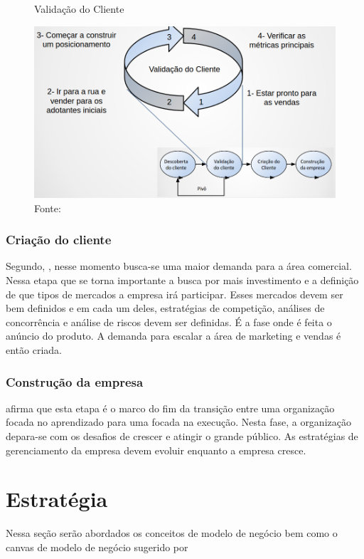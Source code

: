 \begin{figure}[H]
\caption{Validação do Cliente}
\centerline{\includegraphics[scale=0.5]{img/validacao_do_cliente}}
\label{fig:validacao_do_cliente}
\caption* {Fonte: }
\end{figure}

\subsubsection{Criação do cliente}
\label{cha:criacao_do_cliente}
Segundo, , nesse momento busca-se uma maior demanda para a área comercial. Nessa etapa que se torna importante a busca por mais investimento e a definição de que tipos de mercados a empresa irá participar. Esses mercados devem ser bem definidos e em cada um deles, estratégias de competição, análises de concorrência e análise de riscos devem ser definidas. É a fase onde é feita o anúncio do produto. A demanda para escalar a área de marketing e vendas é então criada.

\subsubsection{Construção da empresa}
\label{cha:construcao_da_empresa}
 afirma que esta etapa é o marco do fim da transição entre uma organização focada no aprendizado para uma focada na execução. Nesta fase, a organização depara-se com os desafios de crescer e atingir o grande público. As estratégias de gerenciamento da empresa devem evoluir enquanto a empresa cresce.

\section{Estratégia}
\label{cha:estrategia}
Nessa seção serão abordados os conceitos de modelo de negócio bem como o canvas de modelo de negócio sugerido por 

